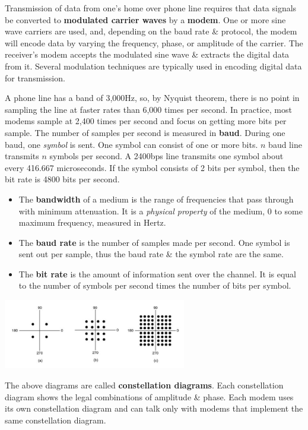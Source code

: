 \documentclass[11pt]{article}
\begin{document}
Transmission of data from one's home over phone line requires that data signals be converted to \textbf{modulated carrier waves} 
by a \textbf{modem}.
One or more sine wave carriers are used, and, depending on the baud rate \& protocol, the modem will encode data by varying the 
frequency, phase, or amplitude of the carrier. 
The receiver's modem accepts the modulated sine wave \& extracts the digital data from it. 
Several modulation techniques are typically used in encoding digital data for transmission. 

A phone line has a band of 3,000Hz, so, by Nyquist theorem, there is no point in sampling the line at faster rates than 6,000 times per second. 
In practice, most modems sample at 2,400 times per second and focus on getting more bits per sample.
The number of samples per second is measured in \textbf{baud}. 
During one baud, one \textit{symbol} is sent.
One symbol can consist of one or more bits.
$n$ baud line transmits $n$ symbols per second. 
A 2400bps line transmits one symbol about every 416.667 microseconds. 
If the symbol consists of 2 bits per symbol, then the bit rate is 4800 bits per second.
    
\begin{itemize}
    \item   The \textbf{bandwidth} of a medium is the range of frequencies that pass through with minimum attenuation. 
            It is a \textit{physical property} of the medium, 0 to some maximum frequency, measured in Hertz.
    \item   The \textbf{baud rate} is the number of samples made per second. 
            One symbol is sent out per sample, thus the baud rate \& the symbol rate are the same.
    \item   The \textbf{bit rate} is the amount of information sent over the channel. 
            It is equal to the number of symbols per second times the number of bits per symbol.
\end{itemize}

\begin{center}
    \includegraphics[width=0.6\textwidth]{moreaboutmodems.png}
\end{center}
The above diagrams are called \textbf{constellation diagrams}. 
Each constellation diagram shows the legal combinations of amplitude \& phase. 
Each modem uses its own constellation diagram and can talk only with modems that implement the same constellation diagram.
\end{document}
